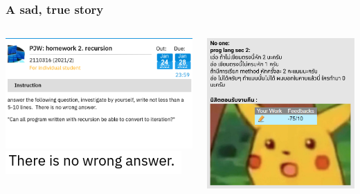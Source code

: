 \documentclass[aspectratio=169]{beamer}
\begin{document}
\begin{frame}
    \frametitle{A sad, true story}
    \pause
    \begin{columns}
        \begin{column}{0.4\textwidth}
            \centering
            \includegraphics[scale=0.3]{proglangsec1}
            \includegraphics[scale=0.5]{proglangsec1_nowrong}
        \end{column}
        \pause
        \begin{column}{0.4\textwidth}
            \centering
            \includegraphics[scale=0.2]{proglangsec2}
        \end{column}
    \end{columns}
\end{frame}
\end{document}
